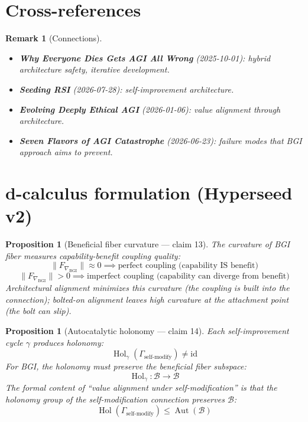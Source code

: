 \documentclass[11pt,a4paper]{article}
\newtheorem{proposition}[definition]{Proposition}
\newtheorem{remark}[definition]{Remark}
\begin{document}
\section{Cross-references}

\begin{remark}[Connections]
\begin{itemize}
\item \textbf{Why Everyone Dies Gets AGI All Wrong} (2025-10-01): hybrid
  architecture safety, iterative development.
\item \textbf{Seeding RSI} (2026-07-28): self-improvement architecture.
\item \textbf{Evolving Deeply Ethical AGI} (2026-01-06): value alignment
  through architecture.
\item \textbf{Seven Flavors of AGI Catastrophe} (2026-06-23): failure
  modes that BGI approach aims to prevent.
\end{itemize}
\end{remark}

\section{d-calculus formulation (Hyperseed v2)}

\begin{proposition}[Beneficial fiber curvature --- claim 13]
\label{prop:curvature}
The curvature of BGI fiber measures capability-benefit coupling quality:
\[
  \|F_{\nabla_{\text{BGI}}}\| \approx 0 \implies \text{perfect coupling
    (capability IS benefit)}
\]
\[
  \|F_{\nabla_{\text{BGI}}}\| > 0 \implies \text{imperfect coupling
    (capability can diverge from benefit)}
\]
Architectural alignment minimizes this curvature (the coupling is built
into the connection); bolted-on alignment leaves high curvature at the
attachment point (the bolt can slip).
\end{proposition}

\begin{proposition}[Autocatalytic holonomy --- claim 14]
\label{prop:holonomy}
Each self-improvement cycle $\gamma$ produces holonomy:
\[
  \operatorname{Hol}_\gamma(\Gamma_{\text{self-modify}}) \neq \mathrm{id}
\]
For BGI, the holonomy must preserve the beneficial fiber subspace:
\[
  \operatorname{Hol}_\gamma: \mathcal{B} \to \mathcal{B}
\]
The formal content of ``value alignment under self-modification'' is
that the holonomy group of the self-modification connection preserves
$\mathcal{B}$:
\[
  \operatorname{Hol}(\Gamma_{\text{self-modify}}) \leq
    \operatorname{Aut}(\mathcal{B})
\]
\end{proposition}
\end{document}
